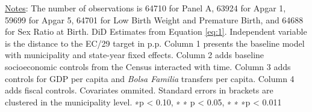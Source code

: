 \begin{table}[h!]
\begin{footnotesize}
\begin{center}
{\begin{threeparttable}[b]
    
    \begin{tablenotes}
  \scriptsize{\underline{Notes}: The number of observations is 64710 for Panel A, 63924 for Apgar 1, 59699 for Apgar 5, 64701 for Low Birth Weight and Premature Birth, and 64688 for Sex Ratio at Birth. DiD Estimates from Equation \ref{eq:1}. Independent variable is the distance to the EC/29 target in p.p. Column 1 presents the baseline model with municipality and state-year fixed effects. Column 2 adds baseline socioeconomic controls from the Census interacted with time. Column 3 adds controls for GDP per capita and \emph{Bolsa Familia} transfers per capita. Column 4 adds fiscal controls. Covariates ommited. Standard errors in brackets are clustered in the municipality level. ∗p < 0.10, ∗ ∗ p < 0.05, ∗ ∗ ∗p < 0.011}
  \end{tablenotes}
    
    
  \label{table:birth}%

\end{threeparttable}
}
\end{center}
\end{footnotesize}
\end{table}
